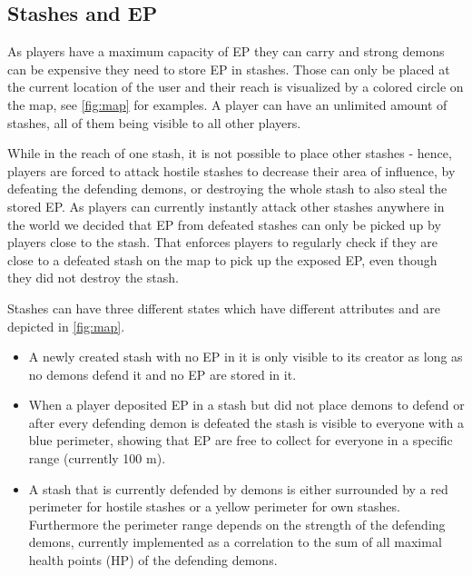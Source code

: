 \subsection{Stashes and EP}
\label{subsec:stashesandep}

As players have a maximum capacity of EP they can carry and strong demons can be expensive they need to store EP in stashes.
Those can only be placed at the current location of the user and their reach is visualized by a colored circle on the map, see \autoref{fig:map} for examples.
A player can have an unlimited amount of stashes, all of them being visible to all other players. 

While in the reach of one stash, it is not possible to place other stashes - hence, players are forced to attack hostile stashes to decrease their area of influence, by defeating the defending demons, or destroying the whole stash to also steal the stored EP.
As players can currently instantly attack other stashes anywhere in the world we decided that EP from defeated stashes can only be picked up by players close to the stash.
That enforces players to regularly check if they are close to a defeated stash on the map to pick up the exposed EP, even though they did not destroy the stash.

Stashes can have three different states which have different attributes and are depicted in \autoref{fig:map}.

\begin{itemize}
    \item A newly created stash with no EP in it is only visible to its creator as long as no demons defend it and no EP are stored in it.
    \item When a player deposited EP in a stash but did not place demons to defend or after every defending demon is defeated the stash is visible to everyone with a blue perimeter, showing that EP are free to collect for everyone in a specific range (currently 100 m).
    \item A stash that is currently defended by demons is either surrounded by a red perimeter for hostile stashes or a yellow perimeter for own stashes. 
Furthermore the perimeter range depends on the strength of the defending demons, currently implemented as a correlation to the sum of all maximal health points (HP) of the defending demons.
\end{itemize}

